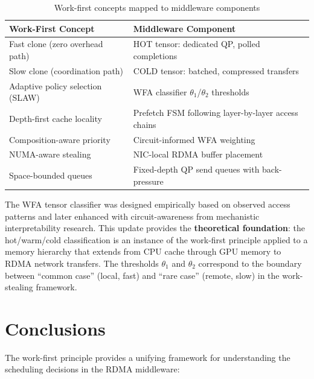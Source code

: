\documentclass[11pt,letterpaper]{article}
\begin{document}
\begin{table}[htbp]
\centering
\caption{Work-first concepts mapped to middleware components}
\label{tab:connection}
\begin{tabular}{@{}ll@{}}
\toprule
\textbf{Work-First Concept} & \textbf{Middleware Component} \\
\midrule
Fast clone (zero overhead path) & HOT tensor: dedicated QP, polled completions \\
Slow clone (coordination path) & COLD tensor: batched, compressed transfers \\
Adaptive policy selection (SLAW) & WFA classifier $\theta_1$/$\theta_2$ thresholds \\
Depth-first cache locality & Prefetch FSM following layer-by-layer access chains \\
Composition-aware priority & Circuit-informed WFA weighting \\
NUMA-aware stealing & NIC-local RDMA buffer placement \\
Space-bounded queues & Fixed-depth QP send queues with back-pressure \\
\bottomrule
\end{tabular}
\end{table}

The WFA tensor classifier was designed empirically based on observed access patterns and later enhanced with circuit-awareness from mechanistic interpretability research. This update provides the \textbf{theoretical foundation}: the hot/warm/cold classification is an instance of the work-first principle applied to a memory hierarchy that extends from CPU cache through GPU memory to RDMA network transfers. The thresholds $\theta_1$ and $\theta_2$ correspond to the boundary between ``common case'' (local, fast) and ``rare case'' (remote, slow) in the work-stealing framework.

\section{Conclusions}
\label{sec:conclusions}

The work-first principle provides a unifying framework for understanding the scheduling decisions in the RDMA middleware:
\end{document}
